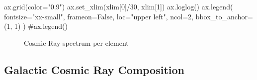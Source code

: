 \documentclass[
  letterpaper,
  DIV=11,
  numbers=noendperiod]{scrreprt}
\newenvironment{Shaded}{\begin{snugshade}}{\end{snugshade}}
\newcommand{\CommentTok}[1]{\textcolor[rgb]{0.37,0.37,0.37}{#1}}
\newcommand{\DecValTok}[1]{\textcolor[rgb]{0.68,0.00,0.00}{#1}}
\newcommand{\NormalTok}[1]{\textcolor[rgb]{0.00,0.23,0.31}{#1}}
\newcommand{\OperatorTok}[1]{\textcolor[rgb]{0.37,0.37,0.37}{#1}}
\newcommand{\StringTok}[1]{\textcolor[rgb]{0.13,0.47,0.30}{#1}}
\newcommand{\VariableTok}[1]{\textcolor[rgb]{0.07,0.07,0.07}{#1}}
\begin{document}
\begin{Shaded}
\begin{Highlighting}[]
\NormalTok{ax.grid(color}\OperatorTok{=}\StringTok{"0.9"}\NormalTok{)}
\NormalTok{ax.set\_xlim(xlim[}\DecValTok{0}\NormalTok{]}\OperatorTok{/}\DecValTok{30}\NormalTok{, xlim[}\DecValTok{1}\NormalTok{])}
\NormalTok{ax.loglog()}
\NormalTok{ax.legend(}
\NormalTok{    fontsize}\OperatorTok{=}\StringTok{"xx{-}small"}\NormalTok{, frameon}\OperatorTok{=}\VariableTok{False}\NormalTok{, loc}\OperatorTok{=}\StringTok{"upper left"}\NormalTok{, ncol}\OperatorTok{=}\DecValTok{2}\NormalTok{, bbox\_to\_anchor}\OperatorTok{=}\NormalTok{(}\DecValTok{1}\NormalTok{, }\DecValTok{1}\NormalTok{)}
\NormalTok{)}
\CommentTok{\#ax.legend()}
\end{Highlighting}
\end{Shaded}

\begin{figure}[H]


\caption{\label{fig-primaries}Cosmic Ray spectrum per element}

\end{figure}%

\subsection*{Galactic Cosmic Ray
Composition}\label{galactic-cosmic-ray-composition}
\end{document}

